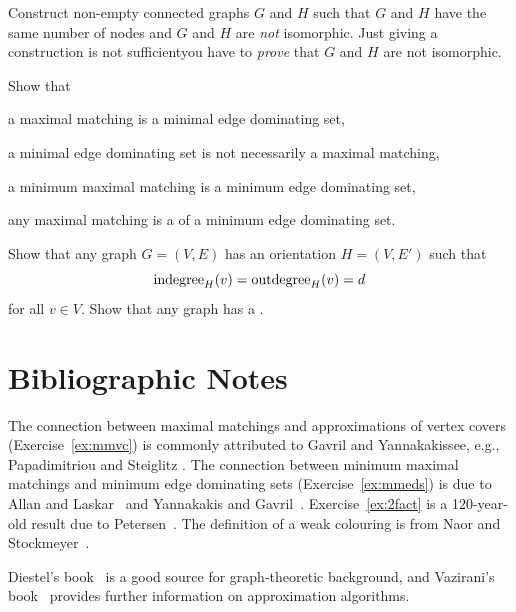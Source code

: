 \begin{ex}[isomorphism]
    Construct non-empty  connected graphs $G$ and $H$ such that $G$ and $H$ have the same number of nodes and $G$ and $H$ are \emph{not} isomorphic. Just giving a construction is not sufficient\mydash you have to \emph{prove} that $G$ and $H$ are not isomorphic.
\end{ex}

\begin{exs}\label{ex:mmeds}
    Show that
    \begin{subex}
        \item a maximal matching is a minimal edge dominating set,
        \item a minimal edge dominating set is not necessarily a maximal matching,
        \item a minimum maximal matching is a minimum edge dominating set,
        \item any maximal matching is a  of a minimum edge dominating set.
    \end{subex}
\end{exs}

\begin{exs}[Petersen 1891]\label{ex:2fact}
    Show that any  graph $G = (V,E)$ has an orientation $H = (V,E')$ such that \[\operatorname{indegree}_H(v) = \operatorname{outdegree}_H(v) = d\] for all $v \in V$. Show that any  graph has a .
\end{exs}


\section{Bibliographic Notes}

The connection between maximal matchings and approximations of vertex covers (Exercise~\ref{ex:mmvc}) is commonly attributed to Gavril and Yannakakis\mydash see, e.g., Papadimitriou and Steiglitz \cite{papadimitriou98combinatorial}. The connection between minimum maximal matchings and minimum edge dominating sets (Exercise~\ref{ex:mmeds}) is due to Allan and Laskar~\cite{allan78domination} and Yannakakis and Gavril~\cite{yannakakis80edge}. Exercise~\ref{ex:2fact} is a 120-year-old result due to Petersen~\cite{petersen1891dietheorie}. The definition of a weak colouring is from Naor and Stockmeyer~\cite{naor95what}.

Diestel's book~\cite{diestel05graph} is a good source for graph-theoretic background, and Vazirani's book~\cite{vazirani01approximation} provides further information on approximation algorithms.
